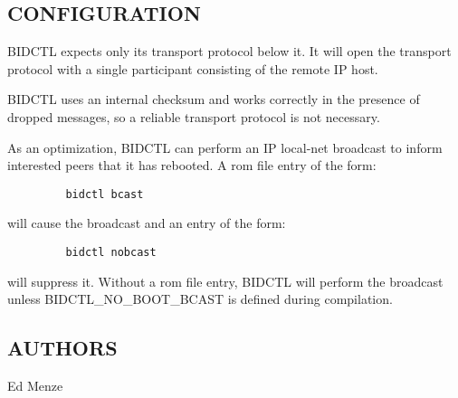 \subsection*{CONFIGURATION}

BIDCTL expects only its transport protocol below it.  It will open the
transport protocol with a single participant consisting of the remote
IP host. 

BIDCTL uses an internal checksum and works correctly in the presence
of dropped messages, so a reliable transport protocol is not
necessary. 

As an optimization, BIDCTL can perform an IP local-net broadcast to
inform interested peers that it has rebooted.  A rom file entry of the
form:
\begin{verbatim}
         bidctl	bcast
\end{verbatim}
will cause the broadcast and an entry of the form:
\begin{verbatim}
         bidctl	nobcast
\end{verbatim}
will suppress it.  Without a rom file entry, BIDCTL will perform the broadcast
unless BIDCTL\_NO\_BOOT\_BCAST is defined during
compilation. 


\subsection*{AUTHORS}

\noindent Ed Menze

